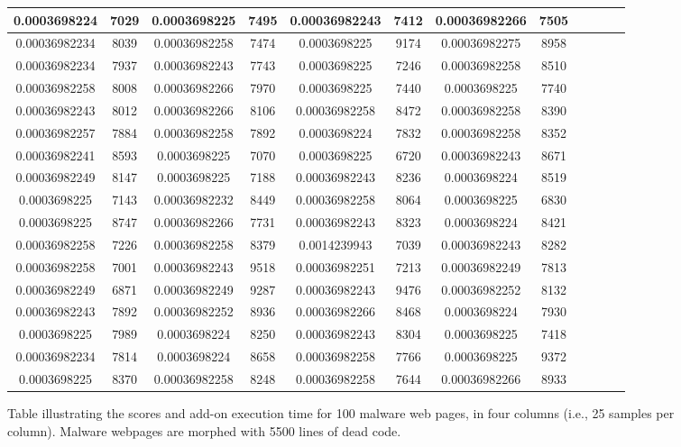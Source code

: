 \begin{figure}[h]
\begin{tabular}{|c|c|c|c|c|c|c|c|c|c|c|c|}
\midrule
0.0003698224&7029&0.0003698225&7495&0.00036982243&7412&0.00036982266&7505\\
\midrule
0.00036982234&8039&0.00036982258&7474&0.0003698225&9174&0.00036982275&8958\\
\midrule
0.00036982234&7937&0.00036982243&7743&0.0003698225&7246&0.00036982258&8510\\
\midrule
0.00036982258&8008&0.00036982266&7970&0.0003698225&7440&0.0003698225&7740\\
\midrule
0.00036982243&8012&0.00036982266&8106&0.00036982258&8472&0.00036982258&8390\\
\midrule
0.00036982257&7884&0.00036982258&7892&0.0003698224&7832&0.00036982258&8352\\
\midrule
0.00036982241&8593&0.0003698225&7070&0.0003698225&6720&0.00036982243&8671\\
\midrule
0.00036982249&8147&0.0003698225&7188&0.00036982243&8236&0.0003698224&8519\\
\midrule
0.0003698225&7143&0.00036982232&8449&0.00036982258&8064&0.0003698225&6830\\
\midrule
0.0003698225&8747&0.00036982266&7731&0.00036982243&8323&0.0003698224&8421\\
\midrule
0.00036982258&7226&0.00036982258&8379&0.0014239943&7039&0.00036982243&8282\\
\midrule
0.00036982258&7001&0.00036982243&9518&0.00036982251&7213&0.00036982249&7813\\
\midrule
0.00036982249&6871&0.00036982249&9287&0.00036982243&9476&0.00036982252&8132\\
\midrule
0.00036982243&7892&0.00036982252&8936&0.00036982266&8468&0.0003698224&7930\\
\midrule
0.0003698225&7989&0.0003698224&8250&0.00036982243&8304&0.0003698225&7418\\
\midrule
0.00036982234&7814&0.0003698224&8658&0.00036982258&7766&0.0003698225&9372\\
\midrule
0.0003698225&8370&0.00036982258&8248&0.00036982258&7644&0.00036982266&8933\\
\midrule
\end{tabular}
    \caption[Scores table of malware web pages]{Table illustrating the scores and add-on execution time for 100 malware web pages, in four columns (i.e., 25 samples per column). Malware webpages are morphed with 5500 lines of dead code. }
    \label{fig:m5500table}
\end{figure}

